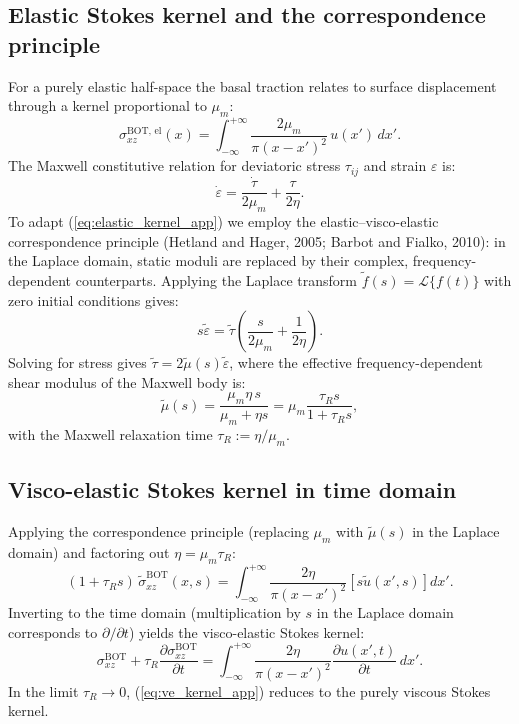 \documentclass[12pt]{article}
\begin{document}
\subsection*{Elastic Stokes kernel and the correspondence principle}

For a purely elastic half-space the basal traction relates to surface
displacement through a kernel proportional to $\mu_m$:
\begin{equation}
\sigma_{xz}^{\text{BOT, el}}(x) =
  \int_{-\infty}^{+\infty}\frac{2\mu_m}{\pi(x-x')^2}\,u(x')\,dx'.
\label{eq:elastic_kernel_app}
\end{equation}
The Maxwell constitutive relation for deviatoric stress $\tau_{ij}$ and
strain $\varepsilon$ is:
\begin{equation}
\dot{\varepsilon} = \frac{\dot{\tau}}{2\mu_m} + \frac{\tau}{2\eta}.
\end{equation}
To adapt (\ref{eq:elastic_kernel_app}) we employ the elastic--visco-elastic
correspondence principle (Hetland and Hager, 2005; Barbot and Fialko, 2010):
in the Laplace domain, static moduli are replaced by their complex,
frequency-dependent counterparts. Applying the Laplace transform
$\tilde{f}(s)=\mathcal{L}\{f(t)\}$ with zero initial conditions gives:
\begin{equation}
s\tilde{\varepsilon} = \tilde{\tau}\!\left(\frac{s}{2\mu_m}+\frac{1}{2\eta}\right).
\end{equation}
Solving for stress gives $\tilde{\tau} = 2\tilde{\mu}(s)\tilde{\varepsilon}$,
where the effective frequency-dependent shear modulus of the Maxwell body is:
\begin{equation}
\tilde{\mu}(s) = \frac{\mu_m\eta\,s}{\mu_m + \eta s}
               = \mu_m\frac{\tau_R s}{1+\tau_R s},
\end{equation}
with the Maxwell relaxation time $\tau_R := \eta/\mu_m$.

\subsection*{Visco-elastic Stokes kernel in time domain}

Applying the correspondence principle (replacing $\mu_m$ with $\tilde{\mu}(s)$
in the Laplace domain) and factoring out $\eta = \mu_m\tau_R$:
\begin{equation}
(1+\tau_R s)\,\tilde{\sigma}_{xz}^{\text{BOT}}(x,s) =
  \int_{-\infty}^{+\infty}\frac{2\eta}{\pi(x-x')^2}
  \left[s\tilde{u}(x',s)\right]dx'.
\end{equation}
Inverting to the time domain (multiplication by $s$ in the Laplace domain
corresponds to $\partial/\partial t$) yields the visco-elastic Stokes kernel:
\begin{equation}
\sigma_{xz}^{\text{BOT}} + \tau_R\frac{\partial\sigma_{xz}^{\text{BOT}}}{\partial t}
= \int_{-\infty}^{+\infty}\frac{2\eta}{\pi(x-x')^2}
  \frac{\partial u(x',t)}{\partial t}\,dx'.
\label{eq:ve_kernel_app}
\end{equation}
In the limit $\tau_R\to 0$, (\ref{eq:ve_kernel_app}) reduces to the purely viscous
Stokes kernel.
\end{document}
